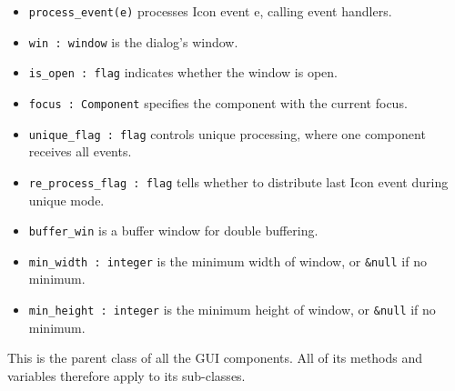 \begin{itemize}
\item\noindent\texttt{process\_event(e)} processes Icon event e, calling event handlers.

\item\noindent\texttt{win : window} is the dialog's window.

\item\noindent\texttt{is\_open : flag} indicates whether the window is open.

\item\noindent\texttt{focus : Component} specifies the component with the current focus.

\item\noindent\texttt{unique\_flag : flag} controls unique processing, where one
component receives all events.

\item\noindent\texttt{re\_process\_flag : flag} tells whether to distribute last
Icon event during unique mode.

\item\noindent\texttt{buffer\_win} is a buffer window for double buffering.

\item\noindent\texttt{min\_width : integer} is the minimum width of window, or \texttt{\&null} if no
minimum.

\item\noindent\texttt{min\_height : integer} is the minimum height of window, or \texttt{\&null} if no
minimum.
\end{itemize}


This is the parent class of all the GUI components. All of its methods
and variables therefore apply to its sub-classes.

